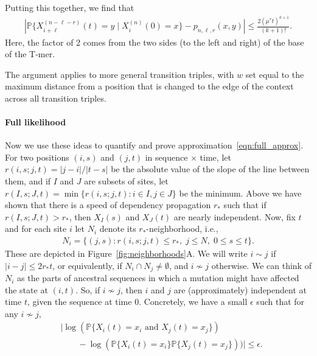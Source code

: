 \documentclass{article}
\renewcommand{\P}{\mathbb{P}}
\theoremstyle{plain}
\theoremstyle{definition}
\begin{document}
Putting this together,
we find that
\begin{align*}
    \left|
        \P\{ X_{i+\ell}^{(n-\ell-r)}(t) = y \mid X_i^{(n)}(0) = x \}
        -
        p_{n,\ell,r}(x,y)
    \right|
    \le
    \frac{
        2 (\mu^* t)^{k+1}
    }{
        (k+1)!
    } .
\end{align*}
Here, the factor of 2 comes from the two sides (to the left and right) of the base of the T-mer.

The argument applies to more general transition triples,
with $w$ set equal to the maximum distance
from a position that is changed to the edge of the context
across all transition triples.


\paragraph{Full likelihood}
Now we use these ideas to quantify and prove approximation~\eqref{eqn:full_approx}.
For two positions $(i,s)$ and $(j,t)$ in sequence $\times$ time,
let $r(i,s;j,t) = |j-i|/|t-s|$ be the absolute value of the
slope of the line between them,
and if $I$ and $J$ are subsets of sites, let $r(I,s;J,t) = \min\{r(i,s;j,t) : i\in I, j \in J\}$
be the minimum.
Above we have shown that there is a speed of dependency propagation $r_*$
such that if $r(I,s;J,t) > r_*$,
then $X_I(s)$ and $X_J(t)$ are nearly independent.
Now, fix $t$ and for each site $i$ let $N_i$ denote its $r_*$-neighborhood,
i.e.,
\begin{align}
    N_i = \{ (j,s) : r(i,s; j,t) \le r_*, \; j \leq N, \; 0 \le s \le t \} .
\end{align}
These are depicted in Figure~\ref{fig:neighborhoods}A.
We will write $i \sim j$ if $|i-j| \le 2 r_* t$,
or equivalently, if $N_i \cap N_j \neq \emptyset$,
and $i \nsim j$ otherwise.
We can think of $N_i$ as the parts of ancestral sequences in which a mutation might have affected the state at $(i,t)$.
So, if $i \nsim j$, then $i$ and $j$ are (approximately) independent at time $t$, given the sequence at time 0.
Concretely,
we have a small $\epsilon$ such that for any $i \nsim j$,
\begin{align*}
    &\big|
    \log( \P\{ X_i(t) = x_i \text{ and } X_j(t) = x_j \} ) \\
    &\qquad {} -
    \log( \P\{ X_i(t) = x_i \} \P\{ X_j(t) = x_j \} )
    ) \big|
    \le \epsilon .
\end{align*}
\end{document}
